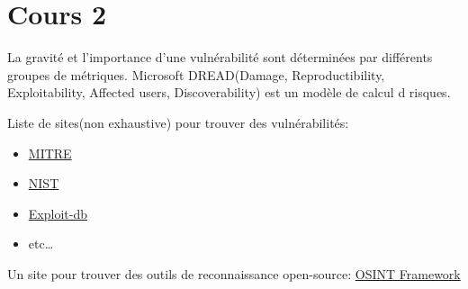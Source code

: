 \section{Cours 2}
La gravit\'e et l'importance d'une vuln\'erabilit\'e sont d\'etermin\'ees par diff\'erents groupes de m\'etriques.
Microsoft DREAD(Damage, Reproductibility, Exploitability, Affected users, Discoverability) est un mod\`ele de calcul d
risques.

Liste de sites(non exhaustive) pour trouver des vuln\'erabilit\'es:
\begin{itemize}
  \item \href{https://attack.mitre.org/}{MITRE}
  \item \href{http://nvd.nist.gov/}{NIST}
  \item \href{https://www.exploit-db.com/}{Exploit-db}
  \item etc\dots
\end{itemize}

Un site pour trouver des outils de reconnaissance open-source: \href{https://osintframework.com/}{OSINT Framework}
